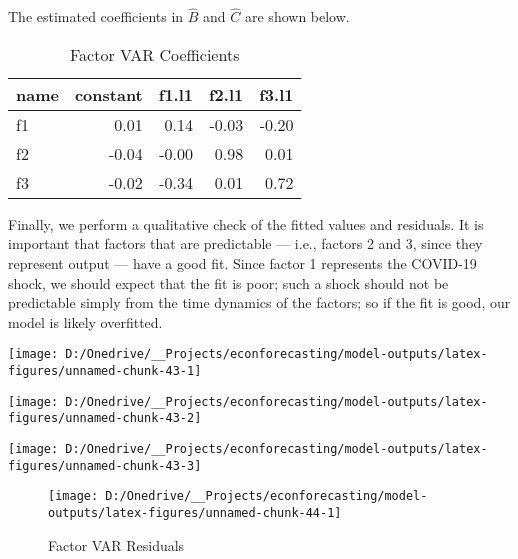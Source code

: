 \documentclass[11pt, letterpaper]{article}\usepackage[]{graphicx}\usepackage[]{color}
\begin{document}
The estimated coefficients in $\widehat{B}$ and $\widehat{C}$ are shown below.
\begin{table}[H]
\centering
\begingroup\footnotesize
\begin{tabular}{lrrrr}
  \hline
name & constant & f1.l1 & f2.l1 & f3.l1 \\ 
  \hline
f1 & 0.01 & 0.14 & -0.03 & -0.20 \\ 
  f2 & -0.04 & -0.00 & 0.98 & 0.01 \\ 
  f3 & -0.02 & -0.34 & 0.01 & 0.72 \\ 
   \hline
\end{tabular}
\endgroup
\caption{Factor VAR Coefficients} 
\end{table}



Finally, we perform a qualitative check of the fitted values and residuals. It is important that factors that are predictable --- i.e., factors 2 and 3, since they represent output --- have a good fit. Since factor 1 represents the COVID-19 shock, we should expect that the fit is poor; such a shock should not be predictable simply from the time dynamics of the factors; so if the fit is good, our model is likely overfitted.


{\centering \texttt{[image: D:/Onedrive/\_\_Projects/econforecasting/model-outputs/latex-figures/unnamed-chunk-43-1]} 

}




{\centering \texttt{[image: D:/Onedrive/\_\_Projects/econforecasting/model-outputs/latex-figures/unnamed-chunk-43-2]} 

}




{\centering \texttt{[image: D:/Onedrive/\_\_Projects/econforecasting/model-outputs/latex-figures/unnamed-chunk-43-3]} 

}





\begin{figure}[H]

{\centering \texttt{[image: D:/Onedrive/\_\_Projects/econforecasting/model-outputs/latex-figures/unnamed-chunk-44-1]} 

}

\caption[Factor VAR Residuals]{Factor VAR Residuals}\label{fig:unnamed-chunk-44}
\end{figure}
\end{document}
